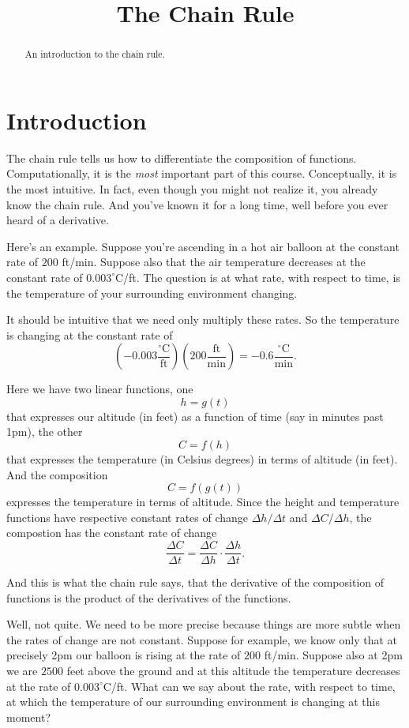 \documentclass{ximera}
\title{The Chain Rule}
\begin{document}
\begin{abstract}
An introduction to the chain rule.
\end{abstract}
\maketitle


\section{Introduction}
The chain rule tells us how to differentiate the composition of functions. Computationally, it is the \emph{most} important part of this course. Conceptually, it is the most intuitive. In fact, even though you might not realize it, you already know the chain rule. And you've known it for a long time, well before you ever heard of a derivative.

Here's an example. Suppose you're ascending in a hot air balloon at the constant rate of $200$ ft/min. Suppose also that the air temperature decreases at the constant rate of $0.003^\circ$C/ft. The question is at what rate, with respect to time, is the temperature of your surrounding environment changing.

It should be intuitive that we need only multiply these rates. So the temperature is changing at the constant rate of 
\[
    \left( -0.003 \frac{^\circ\text{C}}{\text{ft}}\right) \left(200  \frac{\text{ft}}{\text{min}} \right) = -0.6\frac{^\circ\text{C}}{\text{min}} .
\]

Here we have two linear functions, one 
\[
      h = g(t)
\]
that expresses our altitude (in feet) as a function of time (say in minutes past 1pm), the other
\[
         C = f(h)
\]
that expresses the temperature (in Celsius degrees) in terms of altitude (in feet). And the composition 
\[
    C = f(g(t))
\]
expresses the temperature in terms of altitude. Since the height and temperature functions have respective constant rates of change $\Delta h/\Delta t$ and $\Delta C/\Delta h$, the compostion has the constant rate of change
\[
    \frac{\Delta C}{\Delta t} = \frac{\Delta C}{\Delta h} \cdot \frac{\Delta h}{\Delta t} .
\]

And this is what the chain rule says, that the derivative of the composition of functions is the product of the derivatives of the functions.

Well, not quite. We need to be more precise because things are more subtle when the rates of change are not constant. Suppose for example, we know only that at precisely 2pm our balloon is rising at the rate of $200$ ft/min. Suppose also at 2pm we are $2500$ feet above the ground and at this altitude the temperature decreases at the rate of $0.003^\circ$C/ft. What can we say about the rate, with respect to time, at which the temperature of our surrounding environment is changing at this moment?
\end{document}
